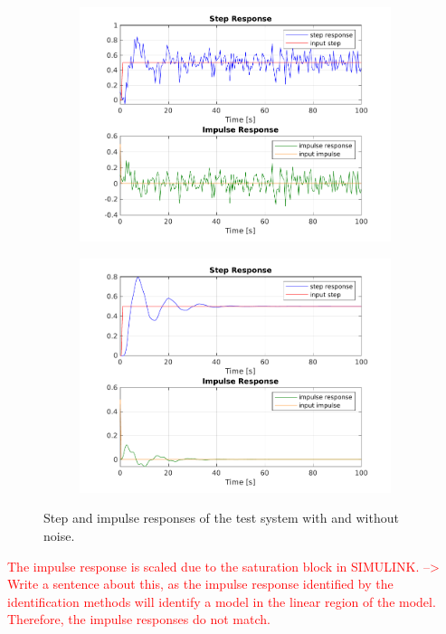 \documentclass{scrartcl}
\begin{document}
\begin{figure}[h]
	\centering
	\begin{subfigure}{0.49\textwidth}
		\includegraphics[width=\textwidth]{figures/noisy_responses.pdf}
	\end{subfigure}
	\begin{subfigure}{0.49\textwidth}
		\includegraphics[width=\textwidth]{figures/noisefree.pdf}
	\end{subfigure}
	\caption{Step and impulse responses of the test system with and without noise.}\label{fig:responses}
\end{figure}

\textcolor{red}{The impulse response is scaled due to the saturation block in SIMULINK. --> Write a sentence about this, as the impulse response identified by the identification methods will identify a model in the linear region of the model. Therefore, the impulse responses do not match.}
\end{document}
